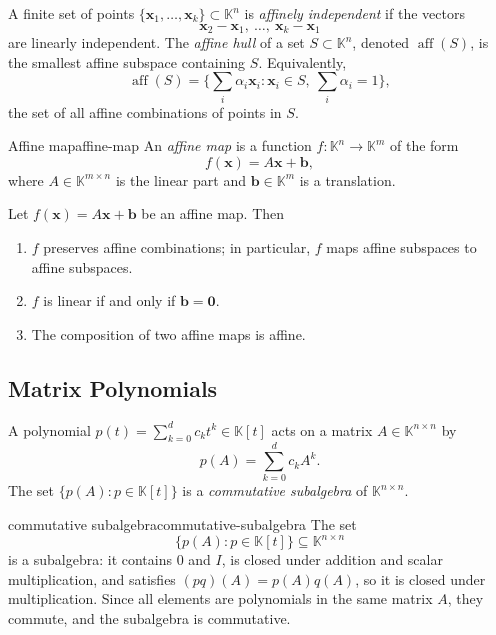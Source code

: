 \documentclass[../../main.tex]{subfiles}
\begin{document}
A finite set of points $\{\mathbf{x}_1,\dots,\mathbf{x}_k\}\subset\mathbb{K}^n$ is \emph{affinely independent} if the vectors
\[
    \mathbf{x}_2-\mathbf{x}_1,\ \dots,\ \mathbf{x}_k-\mathbf{x}_1
\]
are linearly independent. The \emph{affine hull} of a set $S\subset\mathbb{K}^n$, denoted $\operatorname{aff}(S)$, is the smallest affine subspace containing $S$. Equivalently,
\[
    \operatorname{aff}(S)=\Big\{\sum_{i}\alpha_i\mathbf{x}_i : \mathbf{x}_i\in S,\ \sum_i\alpha_i=1\Big\},
\]
the set of all affine combinations of points in $S$.

\begin{definition}{Affine map}{affine-map}
    An \emph{affine map} is a function $f:\mathbb{K}^n\to\mathbb{K}^m$ of the form
    \[
        f(\mathbf{x}) = A\mathbf{x} + \mathbf{b},
    \]
    where $A\in\mathbb{K}^{m\times n}$ is the linear part and $\mathbf{b}\in\mathbb{K}^m$ is a translation.
\end{definition}

Let $f(\mathbf{x})=A\mathbf{x}+\mathbf{b}$ be an affine map. Then
\begin{enumerate}
    \item $f$ preserves affine combinations; in particular, $f$ maps affine subspaces to affine subspaces.
    \item $f$ is linear if and only if $\mathbf{b}=\mathbf{0}$.
    \item The composition of two affine maps is affine.
\end{enumerate}


\subsection{Matrix Polynomials}
\label{sec:polynomials}

A polynomial $p(t)=\sum_{k=0}^d c_k t^k\in\mathbb{K}[t]$ acts on a matrix $A\in\mathbb{K}^{n\times n}$ by
\[
    p(A)=\sum_{k=0}^d c_k A^k.
\]
The set $\{p(A):p\in\mathbb{K}[t]\}$ is a \emph{commutative subalgebra} of $\mathbb{K}^{n\times n}$.

\begin{remark}{commutative subalgebra}{commutative-subalgebra}
    The set
    \[
        \{p(A) : p \in \mathbb{K}[t]\} \subseteq \mathbb{K}^{n \times n}
    \]
    is a subalgebra: it contains $0$ and $I$, is closed under addition and scalar multiplication, and satisfies $(pq)(A) = p(A)q(A)$,
    so it is closed under multiplication.
    Since all elements are polynomials in the same matrix $A$, they commute, and the subalgebra is commutative.
\end{remark}
\end{document}
